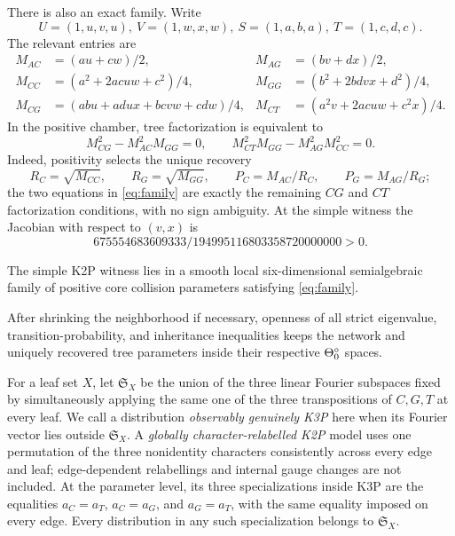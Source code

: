 \documentclass[11pt]{article}
\theoremstyle{remark}\newtheorem{remark}[theorem]{Remark}
\begin{document}
There is also an exact family. Write
\[
U=(1,u,v,u),\ V=(1,w,x,w),\ S=(1,a,b,a),\ T=(1,c,d,c).
\]
The relevant entries are
\begin{align*}
M_{AC}&=(au+cw)/2,&M_{AG}&=(bv+dx)/2,\\
M_{CC}&=(a^2+2acuw+c^2)/4,&M_{GG}&=(b^2+2bdvx+d^2)/4,\\
M_{CG}&=(abu+adux+bcvw+cdw)/4,&M_{CT}&=(a^2v+2acuw+c^2x)/4.
\end{align*}
In the positive chamber, tree factorization is equivalent to
\begin{equation}\label{eq:family}M_{CG}^2-M_{AC}^2M_{GG}=0,\qquad M_{CT}^2M_{GG}-M_{AG}^2M_{CC}^2=0.\end{equation}
Indeed, positivity selects the unique recovery
\[
R_C=\sqrt{M_{CC}},\qquad R_G=\sqrt{M_{GG}},\qquad
P_C=M_{AC}/R_C,\qquad P_G=M_{AG}/R_G;
\]
the two equations in \eqref{eq:family} are exactly the remaining $CG$ and $CT$ factorization conditions, with no sign ambiguity.
At the simple witness the Jacobian with respect to $(v,x)$ is
\[
675554683609333/194995116803358720000000>0.
\]
\begin{corollary}\label{cor:k2p-family}
The simple K2P witness lies in a smooth local six-dimensional semialgebraic family of positive core collision parameters satisfying \eqref{eq:family}.
\end{corollary}
After shrinking the neighborhood if necessary, openness of all strict eigenvalue, transition-probability, and inheritance inequalities keeps the network and uniquely recovered tree parameters inside their respective $\Theta_0^\circ$ spaces.

For a leaf set $X$, let $\mathfrak S_X$ be the union of the three linear Fourier subspaces fixed by simultaneously applying the same one of the three transpositions of $C,G,T$ at every leaf. We call a distribution \emph{observably genuinely K3P} here when its Fourier vector lies outside $\mathfrak S_X$. A \emph{globally character-relabelled K2P} model uses one permutation of the three nonidentity characters consistently across every edge and leaf; edge-dependent relabellings and internal gauge changes are not included. At the parameter level, its three specializations inside K3P are the equalities $a_C=a_T$, $a_C=a_G$, and $a_G=a_T$, with the same equality imposed on every edge. Every distribution in any such specialization belongs to $\mathfrak S_X$.
\end{document}
